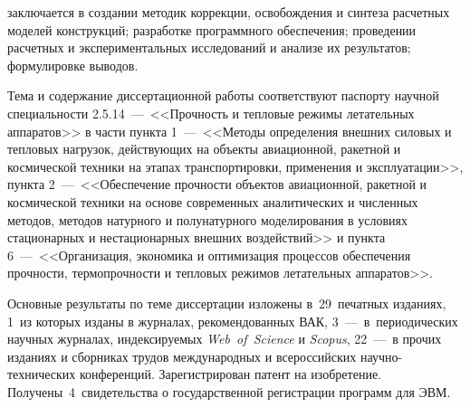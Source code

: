 {\contribution} заключается в создании методик коррекции, освобождения и синтеза расчетных моделей конструкций; разработке программного обеспечения; проведении расчетных и экспериментальных исследований и анализе их результатов; формулировке выводов.

{\pasport}

Тема и содержание диссертационной работы соответствуют паспорту научной специальности 2.5.14~---~<<Прочность и тепловые режимы летательных аппаратов>> в части пункта 1~---~<<Методы определения внешних силовых и тепловых нагрузок, действующих на объекты авиационной, ракетной и космической техники на этапах транспортировки, применения и эксплуатации>>, пункта 2~---~<<Обеспечение прочности объектов авиационной, ракетной и космической техники на основе современных аналитических и численных методов, методов натурного и полунатурного моделирования в условиях стационарных и нестационарных внешних воздействий>> и пункта 6~---~<<Организация, экономика и оптимизация процессов обеспечения прочности, термопрочности и тепловых режимов летательных аппаратов>>.

{\publications} 

Основные результаты по теме диссертации изложены в~29~печатных изданиях, 1~из которых изданы в журналах, рекомендованных ВАК, 3~---~в~периодических научных журналах, индексируемых \textit{Web~of~Science} и \textit{Scopus}, 22~---~в прочих изданиях и сборниках трудов международных и всероссийских научно-технических конференций. Зарегистрирован патент на изобретение. Получены~4~свидетельства о государственной регистрации программ для ЭВМ.
